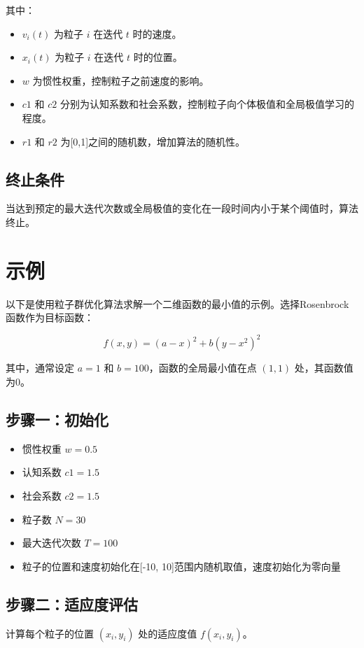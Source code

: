 \documentclass{article}
\begin{document}
其中：
\begin{itemize}
  \item $v_{i}(t)$ 为粒子 $i$ 在迭代 $t$ 时的速度。
  \item $x_{i}(t)$ 为粒子 $i$ 在迭代 $t$ 时的位置。
  \item $w$ 为惯性权重，控制粒子之前速度的影响。
  \item $c1$ 和 $c2$ 分别为认知系数和社会系数，控制粒子向个体极值和全局极值学习的程度。
  \item $r1$ 和 $r2$ 为[0,1]之间的随机数，增加算法的随机性。
\end{itemize}

\subsection{终止条件}
当达到预定的最大迭代次数或全局极值的变化在一段时间内小于某个阈值时，算法终止。

\section{示例}
以下是使用粒子群优化算法求解一个二维函数的最小值的示例。选择Rosenbrock函数作为目标函数：

\begin{equation}
f(x, y) = (a - x)^2 + b(y - x^2)^2
\end{equation}

其中，通常设定 $a = 1$ 和 $b = 100$，函数的全局最小值在点 $(1, 1)$ 处，其函数值为0。

\subsection{步骤一：初始化}
\begin{itemize}
  \item 惯性权重 $w = 0.5$
  \item 认知系数 $c1 = 1.5$
  \item 社会系数 $c2 = 1.5$
  \item 粒子数 $N = 30$
  \item 最大迭代次数 $T = 100$
  \item 粒子的位置和速度初始化在[-10, 10]范围内随机取值，速度初始化为零向量
\end{itemize}

\subsection{步骤二：适应度评估}
计算每个粒子的位置 $(x_i, y_i)$ 处的适应度值 $f(x_i, y_i)$。
\end{document}
